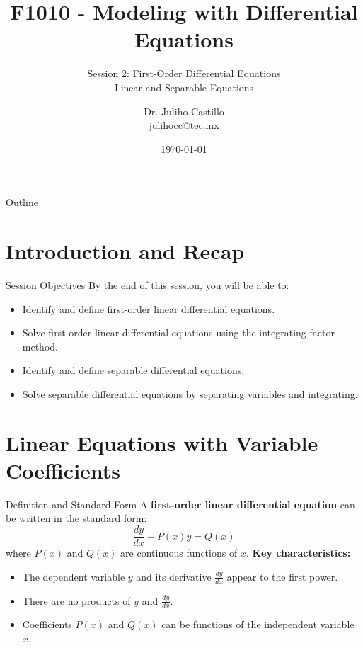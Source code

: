 \documentclass[10pt,aspectratio=169]{beamer}
\title{F1010 - Modeling with Differential Equations}
\subtitle{Session 2: First-Order Differential Equations \\ Linear and Separable Equations}
\author{Dr. Juliho Castillo\\julihocc@tec.mx}
\institute{School of Engineering and Sciences\\Academic Department of Sciences}
\date{\today}
\begin{document}
\maketitle

\begin{frame}{Outline}
    \tableofcontents
\end{frame}

\section{Introduction and Recap}

\begin{frame}{Session Objectives}
    By the end of this session, you will be able to:
    \begin{itemize}
        \item Identify and define first-order linear differential equations.
        \item Solve first-order linear differential equations using the integrating factor method.
        \item Identify and define separable differential equations.
        \item Solve separable differential equations by separating variables and integrating.
    \end{itemize}
\end{frame}

\section{Linear Equations with Variable Coefficients}

\begin{frame}{Definition and Standard Form}
    A \textbf{first-order linear differential equation} can be written in the standard form:
    \begin{equation}
        \frac{dy}{dx} + P(x)y = Q(x)
        \label{eq:linear_de_standard_form}
    \end{equation}
    where $P(x)$ and $Q(x)$ are continuous functions of $x$.
    \vspace{1em}
    \textbf{Key characteristics:}
    \begin{itemize}
        \item The dependent variable $y$ and its derivative $\frac{dy}{dx}$ appear to the first power.
        \item There are no products of $y$ and $\frac{dy}{dx}$.
        \item Coefficients $P(x)$ and $Q(x)$ can be functions of the independent variable $x$.
    \end{itemize}
\end{frame}
\end{document}

